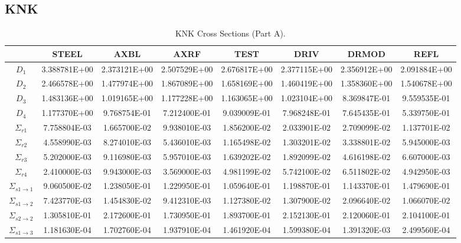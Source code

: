   \subsection{KNK}
    \thispagestyle{lscapedplain}
    \begin{landscape}
    \begin{table}
      \caption{KNK Cross Sections (Part A).}
      \label{tab:knkxs}
      \begin{center}
        \begin{tabular}{cccccccc}
          \toprule
          &STEEL&AXBL&AXRF&TEST&DRIV&DRMOD&REFL\\
          \midrule
          $D_1$&3.388781E+00&2.373121E+00&2.507529E+00&2.676817E+00&2.377115E+00&2.356912E+00&2.091884E+00\\
          $D_2$&2.466578E+00&1.477974E+00&1.867089E+00&1.658169E+00&1.460419E+00&1.358360E+00&1.540678E+00\\
          $D_3$&1.483136E+00&1.019165E+00&1.177228E+00&1.163065E+00&1.023104E+00&8.369847E-01&9.559535E-01\\
          $D_4$&1.177370E+00&9.768754E-01&7.212400E-01&9.039009E-01&7.968248E-01&7.645435E-01&5.339750E-01\\
          $\Sigma_{r1}$&7.758804E-03&1.665700E-02&9.938010E-03&1.856200E-02&2.033901E-02&2.709099E-02&1.137701E-02\\
          $\Sigma_{r2}$&4.558990E-03&8.274010E-03&5.436010E-03&1.165498E-02&1.303201E-02&3.338801E-02&5.945000E-03\\
          $\Sigma_{r3}$&5.202000E-03&9.116980E-03&5.957010E-03&1.639202E-02&1.892099E-02&4.616198E-02&6.607000E-03\\
          $\Sigma_{r4}$&2.410000E-03&9.943000E-03&3.569000E-03&4.981199E-02&5.742100E-02&6.511802E-02&4.942950E-03\\
          $\Sigma_{s 1\rightarrow 1}$&9.060500E-02&1.238050E-01&1.229950E-01&1.059640E-01&1.198870E-01&1.143370E-01&1.479690E-01\\
          $\Sigma_{s 1\rightarrow 2}$&7.423770E-03&1.454830E-02&9.412310E-03&1.127380E-02&1.307900E-02&2.096640E-02&1.066070E-02\\
          $\Sigma_{s 2\rightarrow 2}$&1.305810E-01&2.172600E-01&1.730950E-01&1.893700E-01&2.152130E-01&2.120060E-01&2.104100E-01\\
          $\Sigma_{s 1\rightarrow 3}$&1.181630E-04&1.702760E-04&1.937910E-04&1.461920E-04&1.599380E-04&1.391320E-03&2.499560E-04\\

\end{tabular}
\end{center}
\end{table}
\end{landscape}
